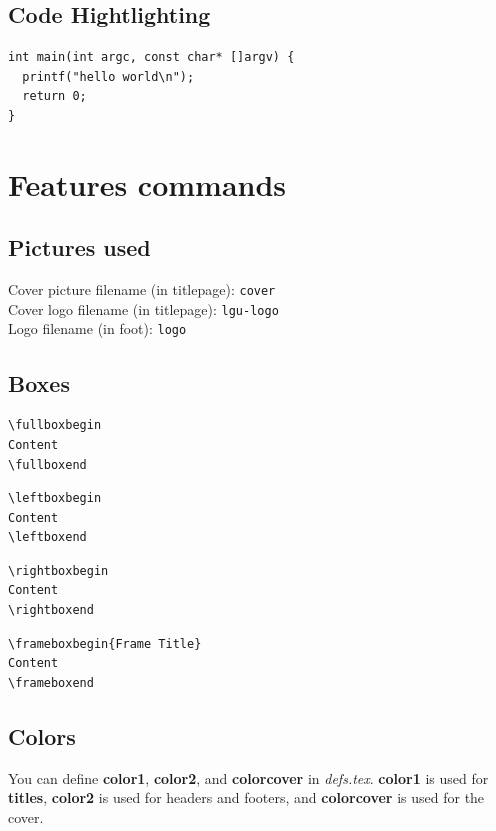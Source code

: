 \documentclass[12pt]{article}
\begin{document}
\subsection{Code Hightlighting}

\begin{verbatim}
int main(int argc, const char* []argv) {
  printf("hello world\n");
  return 0;
}
\end{verbatim}

\section{Features commands}

\subsection{Pictures used}

\noindent
Cover picture filename (in titlepage): \texttt{cover}\\
Cover logo filename (in titlepage): \texttt{lgu-logo}\\
Logo filename (in foot): \texttt{logo}

\subsection{Boxes}

\begin{verbatim}
\fullboxbegin
Content
\fullboxend
\end{verbatim}

\begin{verbatim}
\leftboxbegin
Content
\leftboxend
\end{verbatim}

\begin{verbatim}
\rightboxbegin
Content
\rightboxend
\end{verbatim}

\begin{verbatim}
\frameboxbegin{Frame Title}
Content
\frameboxend
\end{verbatim}

\subsection{Colors}
You can define \textbf{color1}, \textbf{color2}, and \textbf{colorcover} in \textit{defs.tex}. \textbf{color1} is used for \textbf{titles}, \textbf{color2} is used for headers and footers, and \textbf{colorcover} is used for the cover.
\end{document}
